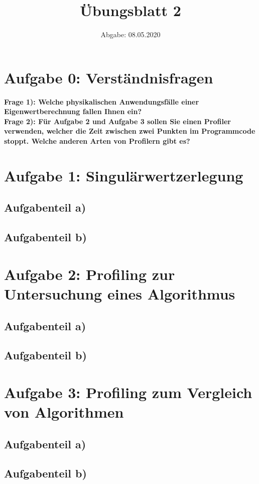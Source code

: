 

\subject{Computational Physics}
\title{Übungsblatt 2}
\date{%
  Abgabe: 08.05.2020
}



\maketitle
\thispagestyle{empty}
\newpage

\section*{Aufgabe 0: Verständnisfragen}

\textbf{Frage 1): Welche physikalischen Anwendungsfälle einer Eigenwertberechnung fallen Ihnen ein?}\\

\textbf{Frage 2): Für Aufgabe 2 und Aufgabe 3 sollen Sie einen Profiler verwenden, welcher die Zeit zwischen zwei Punkten im Programmcode stoppt. Welche anderen Arten von Profilern gibt es?}\\

\section*{Aufgabe 1: Singulärwertzerlegung}

\subsection*{Aufgabenteil a)}

\subsection*{Aufgabenteil b)}

\section*{Aufgabe 2: Profiling zur Untersuchung eines Algorithmus}

\subsection*{Aufgabenteil a)}

\subsection*{Aufgabenteil b)}

\section*{Aufgabe 3: Profiling zum Vergleich von Algorithmen}

\subsection*{Aufgabenteil a)}

\subsection*{Aufgabenteil b)}



